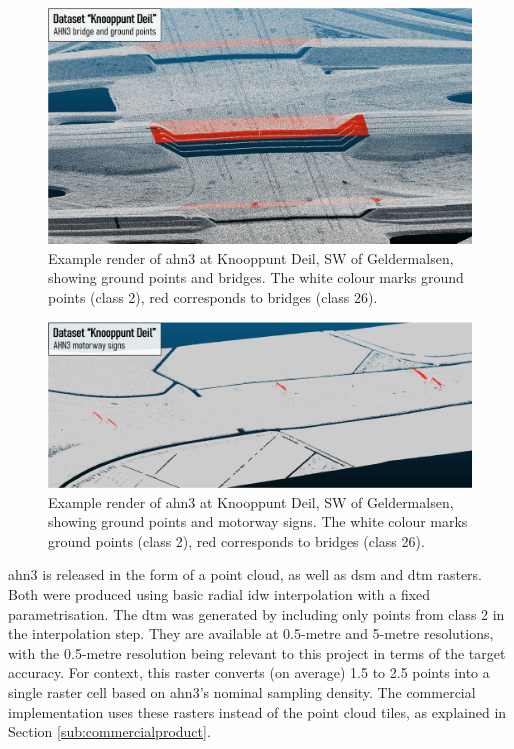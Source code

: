 \begin{figure}
    \centering
    \includegraphics[width=\linewidth]{final_report/figs/ahn_sample_01.png} 
    \caption[Render of AHN3 highlighting bridge points]{Example render of \ac{ahn3} at Knooppunt Deil, SW of Geldermalsen, showing ground points and bridges. The white colour marks ground points (class 2), red corresponds to bridges (class 26).}
    \label{fig:ahnbridges}
\end{figure}

\begin{figure}
    \centering
    \includegraphics[width=\linewidth]{final_report/figs/ahn_sample_02.png} 
    \caption[Render of AHN3 highlighting motorway signs]{Example render of \ac{ahn3} at Knooppunt Deil, SW of Geldermalsen, showing ground points and motorway signs. The white colour marks ground points (class 2), red corresponds to bridges (class 26).}
    \label{fig:ahnsigns}
\end{figure}

\ac{ahn3} is released in the form of a point cloud, as well as \ac{dsm} and \ac{dtm} rasters. Both were produced using basic radial \ac{idw} interpolation with a fixed parametrisation. The \ac{dtm} was generated by including only points from class 2 in the interpolation step. They are available at 0.5-metre and 5-metre resolutions, with the 0.5-metre resolution being relevant to this project in terms of the target accuracy. For context, this raster converts (on average) 1.5 to 2.5 points into a single raster cell based on \ac{ahn3}'s nominal sampling density. The commercial implementation uses these rasters instead of the point cloud tiles, as explained in Section \ref{sub:commercialproduct}.

